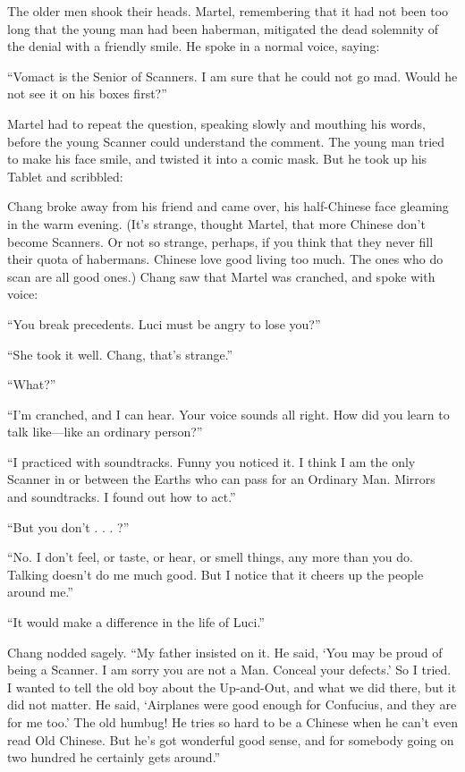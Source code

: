 The older men shook their heads. Martel, remembering that it had not been too long that the young man had been haberman, mitigated the dead solemnity of the denial with a friendly smile. He spoke in a normal voice, saying:

``Vomact is the Senior of Scanners. I am sure that he could not go mad. Would he not see it on his boxes first?''

Martel had to repeat the question, speaking slowly and mouthing his words, before the young Scanner could understand the comment. The young man tried to make his face smile, and twisted it into a comic mask. But he took up his Tablet and scribbled:


Chang broke away from his friend and came over, his half-Chinese face gleaming in the warm evening. (It's strange, thought Martel, that more Chinese don't become Scanners. Or not so strange, perhaps, if you think that they never fill their quota of habermans. Chinese love good living too much. The ones who do scan are all good ones.) Chang saw that Martel was cranched, and spoke with voice:

``You break precedents. Luci must be angry to lose you?''

``She took it well. Chang, that's strange.''

``What?''

``I'm cranched, and I can hear. Your voice sounds all right. How did you learn to talk like---like an ordinary person?''

``I practiced with soundtracks. Funny you noticed it. I think I am the only Scanner in or between the Earths who can pass for an Ordinary Man. Mirrors and soundtracks. I found out how to act.''

``But you don't . . . ?''

``No. I don't feel, or taste, or hear, or smell things, any more than you do. Talking doesn't do me much good. But I notice that it cheers up the people around me.''

``It would make a difference in the life of Luci.''

Chang nodded sagely. ``My father insisted on it. He said, `You may be proud of being a Scanner. I am sorry you are not a Man. Conceal your defects.' So I tried. I wanted to tell the old boy about the Up-and-Out, and what we did there, but it did not matter. He said, `Airplanes were good enough for Confucius, and they are for me too.' The old humbug! He tries so hard to be a Chinese when he can't even read Old Chinese. But he's got wonderful good sense, and for somebody going on two hundred he certainly gets around.''

